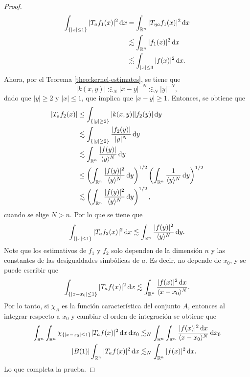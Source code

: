 \begin{proof}
	\begin{align*}
		\int_{\{|x|\leq1\}} |T_af_1(x)|^2 \mathop{}\!\mathrm{d} x & = \int_{\mathbb{R}^n} |T_{\eta a}f_1(x)|^2 \mathop{}\!\mathrm{d} x \\
		& \lesssim \int_{\mathbb{R}^n} |f_1(x)|^2 \mathop{}\!\mathrm{d} x \\ 
		& \lesssim \int_{|x|\leq3}|f(x)|^2\mathop{}\!\mathrm{d} x. 
	\end{align*}
	Ahora, por el Teorema \ref{theo:kernel-estimates}, se tiene que 
	\begin{equation*}
		|k(x, y)| \lesssim_N |x-y|^{-N} \lesssim_N |y|^{-N},
	\end{equation*}
	dado que $|y|\geq2$ y $|x|\leq1$, que implica que $|x-y|\geq1$. Entonces, se obtiene que
	\begin{align*}
		|T_af_2(x)| & \leq \int_{\{|y|\geq2\}} |k(x, y)||f_2(y)|\mathop{}\!\mathrm{d} y \\
		& \lesssim  \int_{\{|y|\geq2\}} \frac{|f_2(y)|}{|y|^N}\mathop{}\!\mathrm{d} y \\
		& \lesssim \int_{\mathbb{R}^n} \frac{|f(y)|}{\langle y\rangle^N}\mathop{}\!\mathrm{d} y \\
		& \leq \left(\int_{\mathbb{R}^n} \frac{|f(y)|^2}{\langle y\rangle^N}\mathop{}\!\mathrm{d} y\right)^{1/2}
		\left(\int_{\mathbb{R}^n} \frac{1}{\langle y\rangle^N}\mathop{}\!\mathrm{d} y\right)^{1/2} \\
		&\lesssim \left(\int_{\mathbb{R}^n} \frac{|f(y)|^2}{\langle y\rangle^N}\mathop{}\!\mathrm{d} y\right)^{1/2},
	\end{align*}
	cuando se elige $N>n$. Por lo que se tiene que
	\begin{equation*}
		\int_{\{|x|\leq1\}} |T_af_2(x)|^2 \mathop{}\!\mathrm{d} x \lesssim \int_{\mathbb{R}^n} \frac{|f(y)|^2}{\langle y\rangle^N}\mathop{}\!\mathrm{d} y.
	\end{equation*}
	Note que los estimativos de $f_1$ y $f_2$ solo dependen de la dimensión $n$ y las constantes de las desigualdades simbólicas de $a$. Es decir, no depende de $x_0$, y se puede escribir que 
	\begin{equation*}
		\int_{\{|x-x_0|\leq1\}} |T_af(x)|^2 \mathop{}\!\mathrm{d} x \lesssim \int_{\mathbb{R}^n} \frac{|f(x)|^2\mathop{}\!\mathrm{d} x}{\langle x-x_0\rangle^N}.
	\end{equation*}
	Por lo tanto, si $\chi_A$ es la función característica del conjunto $A$, entonces al integrar respecto a $x_0$ y cambiar el orden de integración se obtiene que
	\begin{align*}
		\int_{\mathbb{R}^n} \int_{\mathbb{R}^n} \chi_{\{|x-x_0|\leq1\}} |T_af(x)|^2\mathop{}\!\mathrm{d} x \mathop{}\!\mathrm{d} x_0 &\lesssim_N \int_{\mathbb{R}^n} \int_{\mathbb{R}^n}  \frac{|f(x)|^2\mathop{}\!\mathrm{d} x}{\langle x-x_0\rangle^N} \mathop{}\!\mathrm{d} x_0 \\
		|B(1)| \int_{\mathbb{R}^n} |T_af(x)|^2\mathop{}\!\mathrm{d} x &\lesssim_N \int_{\mathbb{R}^n} |f(x)|^2\mathop{}\!\mathrm{d} x.
	\end{align*}
	Lo que completa la prueba.
\end{proof}
